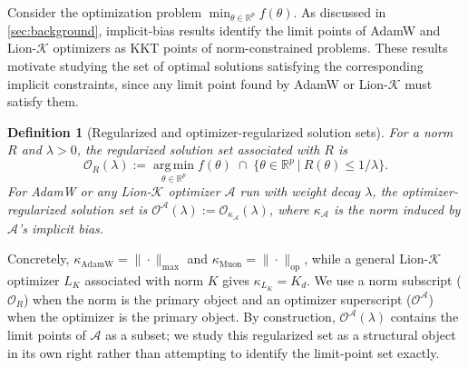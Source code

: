 \documentclass{article}
\newtheorem{definition}{Definition}[section]
\begin{document}
Consider the optimization problem $\min_{\theta \in \mathbb{R}^{p}} f(\theta)$. As discussed in \cref{sec:background}, implicit-bias results identify the limit points of AdamW and Lion-$\mathcal{K}$ optimizers as KKT points of norm-constrained problems. These results motivate studying the set of optimal solutions satisfying the corresponding implicit constraints, since any limit point found by AdamW or Lion-$\mathcal{K}$ must satisfy them.
\begin{definition}[Regularized and optimizer-regularized solution sets]
\label{def:regsolset}
For a norm $R$ and $\lambda > 0$, the regularized solution set associated with $R$ is
\[
\mathcal{O}_{R}(\lambda)
:=
\operatorname*{arg\,min}_{\theta \in \mathbb{R}^p} f(\theta)
\;\cap\;
\{
\theta \in \mathbb{R}^p
\ | \ 
R(\theta) \le 1/\lambda
\}.
\]
For AdamW or any Lion-$\mathcal{K}$ optimizer $\mathcal{A}$ run with weight decay $\lambda$, the optimizer-regularized solution set is $\mathcal{O}^\mathcal{A}(\lambda) := \mathcal{O}_{\kappa_\mathcal{A}}(\lambda)$, where $\kappa_\mathcal{A}$ is the norm induced by $\mathcal{A}$'s implicit bias.
\end{definition}
Concretely, $\kappa_{\mathrm{AdamW}} = \|\cdot\|_{\max}$ and $\kappa_{\mathrm{Muon}} = \|\cdot\|_{\mathrm{op}}$, while a general Lion-$\mathcal{K}$ optimizer $L_K$ associated with norm $K$ gives $\kappa_{L_K} = K_d$. We use a norm subscript ($\mathcal{O}_R$) when the norm is the primary object and an optimizer superscript ($\mathcal{O}^\mathcal{A}$) when the optimizer is the primary object. By construction, $\mathcal{O}^\mathcal{A}(\lambda)$ contains the limit points of $\mathcal{A}$ as a subset; we study this regularized set as a structural object in its own right rather than attempting to identify the limit-point set exactly.
\end{document}
